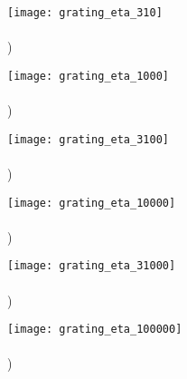 \documentclass[12pt, letterpaper]{article}
\begin{document}
\begin{figure}[t!]
	\begin{minipage}{0.48\textwidth}
		\texttt{[image: grating\_eta\_310]} \\
		\vspace{-13em} \\ ) \\ \vspace{13em}
	\end{minipage}
	\begin{minipage}{0.48\textwidth}
		\texttt{[image: grating\_eta\_1000]} \\
		\vspace{-13em} \\ ) \\ \vspace{13em}
	\end{minipage}
	
	\vspace{-3em}
	
	\begin{minipage}{0.48\textwidth}
		\texttt{[image: grating\_eta\_3100]} \\
		\vspace{-13em} \\ ) \\ \vspace{13em}
	\end{minipage}
	\begin{minipage}{0.48\textwidth}
		\texttt{[image: grating\_eta\_10000]} \\
		\vspace{-13em} \\ ) \\ \vspace{13em}
	\end{minipage}

	\vspace{-3em}
	
	\begin{minipage}{0.48\textwidth}
		\texttt{[image: grating\_eta\_31000]} \\
		\vspace{-13em} \\ ) \\ \vspace{13em}
	\end{minipage}
	\begin{minipage}{0.48\textwidth}
		\texttt{[image: grating\_eta\_100000]} \\
		\vspace{-13em} \\ ) \\ \vspace{13em}
	\end{minipage}


\end{figure}
\end{document}
